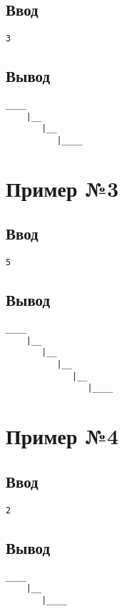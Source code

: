 \documentclass{article}
\begin{document}
\subsection*{Ввод}
\begin{blackbox}
\begin{lstlisting}[style=consolestyle]
3
\end{lstlisting}
\end{blackbox}

\subsection*{Вывод}
\begin{blackbox}
\begin{lstlisting}[style=consolestyle]
____
    |__
       |__
          |____
\end{lstlisting}
\end{blackbox}
\newpage
\section*{Пример №3}

\subsection*{Ввод}
\begin{blackbox}
\begin{lstlisting}[style=consolestyle]
5
\end{lstlisting}
\end{blackbox}

\subsection*{Вывод}
\begin{blackbox}
\begin{lstlisting}[style=consolestyle]
____
    |__
       |__
          |__
             |__
                |____
\end{lstlisting}
\end{blackbox}

\section*{Пример №4}

\subsection*{Ввод}
\begin{blackbox}
\begin{lstlisting}[style=consolestyle]
2
\end{lstlisting}
\end{blackbox}

\subsection*{Вывод}
\begin{blackbox}
\begin{lstlisting}[style=consolestyle]
____
    |__
       |____
\end{lstlisting}
\end{blackbox}
\end{document}
